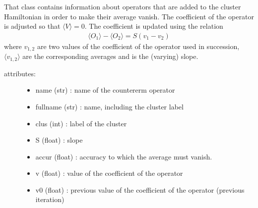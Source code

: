 \documentclass[letterpaper,10pt,english]{sphinxmanual}
\begin{document}
\begin{fulllineitems}
\label{\detokenize{utilities:pyqcm.hartree.counterterm}}
\sphinxAtStartPar
That class contains information about operators that are added to the cluster 
Hamiltonian in order to make their average vanish. The coefficient  of the operator 
is adjusted so that \(\langle V\rangle=0\). The coefficient is updated using the 
relation
\begin{equation*}
\begin{split}\langle O_1\rangle-\langle O_2\rangle = S (v_1-v_2)\end{split}
\end{equation*}
\sphinxAtStartPar
where \(v_{1,2}\) are two values of the coefficient of the operator used in succession,
\(\langle v_{1,2}\rangle\) are the corresponding averages and  is the (varying) slope.
\begin{description}
\item[{attributes:}] \leavevmode\begin{itemize}
\item {} 
\sphinxAtStartPar
name (str) : name of the countererm operator

\item {} 
\sphinxAtStartPar
fullname (str) : name, including the cluster label

\item {} 
\sphinxAtStartPar
clus (int) : label of the cluster

\item {} 
\sphinxAtStartPar
S (float) : slope

\item {} 
\sphinxAtStartPar
accur (float) : accuracy to which the average must vanish.

\item {} 
\sphinxAtStartPar
v (float) : value of the coefficient of the operator

\item {} 
\sphinxAtStartPar
v0 (float) : previous value of the coefficient of the operator (previous iteration)

\end{itemize}


\end{description}
\end{fulllineitems}
\end{document}
